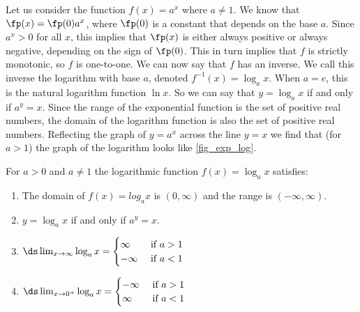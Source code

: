 Let us consider the function $f(x)=a^x$ where $a\neq1$. We know that $\fp(x)=\fp(0)a^x$, where $\fp(0)$ is a constant that depends on the base $a$. Since $a^x>0$ for all $x$, this implies that $\fp(x)$ is either always positive or always negative, depending on the sign of $\fp(0)$. This in turn implies that $f$ is strictly monotonic, so $f$ is one-to-one. We can now say that $f$ has an inverse. We call this inverse the logarithm with base $a$, denoted $f^{-1}(x)=\log_ax$. When $a=e$, this is the natural logarithm function $\ln x$. So we can say that $y=\log_a x$ if and only if $a^y=x$. Since the range of the exponential function is the set of positive real numbers, the domain of the logarithm function is also the set of positive real numbers. Reflecting the graph of $y=a^x$ across the line $y=x$ we find that (for $a>1$) the graph of the logarithm looks like \autoref{fig_exp_log}.

\begin{keyidea}\label{ki_log_func_props}
For $a>0$ and $a\ne1$ the logarithmic function $f(x)=\log_a x$ satisfies:
\begin{enumerate}
\item The domain of $f(x)=log_a x$ is $(0,\infty)$ and the range is $(-\infty,\infty)$.
\item $y=\log_a x$ if and only if $a^y=x$.
\item $\ds\lim_{x\to\infty}\log_a x=
\begin{cases}\infty&\text{ if $a>1$}\\ -\infty&\text{ if $a<1$}\end{cases}$
\item $\ds\lim_{x\to0^+}\log_a x=\begin{cases}-\infty&\text{ if $a>1$}\\\infty&\text{ if $a<1$}\end{cases}$
\end{enumerate}
\end{keyidea}

